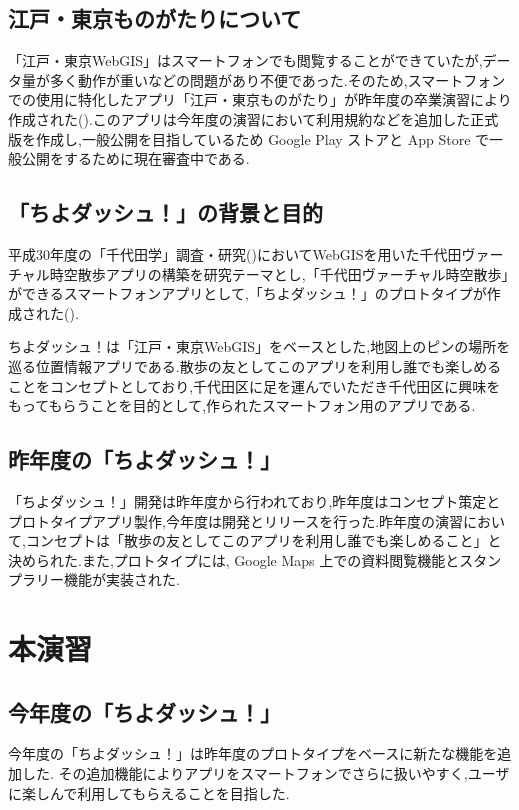 \documentclass[a4paper, twoside]{jarticle}
\begin{document}
\begin{multicols}{2}
\subsection{江戸・東京ものがたりについて}
「江戸・東京WebGIS」はスマートフォンでも閲覧することができていたが,データ量が多く動作が重いなどの問題があり不便であった.そのため,スマートフォンでの使用に特化したアプリ「江戸・東京ものがたり」が昨年度の卒業演習により作成された(\cite{houkokusyo_30}).このアプリは今年度の演習において利用規約などを追加した正式版を作成し,一般公開を目指しているため Google Play ストアと App Store で一般公開をするために現在審査中である.

\subsection{「ちよダッシュ！」の背景と目的}
平成30年度の「千代田学」調査・研究(\cite{tiyokenkyu})においてWebGISを用いた千代田ヴァーチャル時空散歩アプリの構築を研究テーマとし,「千代田ヴァーチャル時空散歩」ができるスマートフォンアプリとして,「ちよダッシュ！」のプロトタイプが作成された(\cite{tiyodagaku_houkokusyo}).

ちよダッシュ！は「江戸・東京WebGIS」をベースとした,地図上のピンの場所を巡る位置情報アプリである.散歩の友としてこのアプリを利用し誰でも楽しめることをコンセプトとしており,千代田区に足を運んでいただき千代田区に興味をもってもらうことを目的として,作られたスマートフォン用のアプリである.

\subsection{昨年度の「ちよダッシュ！」}
「ちよダッシュ！」開発は昨年度から行われており,昨年度はコンセプト策定とプロトタイプアプリ製作,今年度は開発とリリースを行った.昨年度の演習において,コンセプトは「散歩の友としてこのアプリを利用し誰でも楽しめること」と決められた.また,プロトタイプには, Google Maps 上での資料閲覧機能とスタンプラリー機能が実装された.

\section{本演習}

\subsection{今年度の「ちよダッシュ！」}
今年度の「ちよダッシュ！」は昨年度のプロトタイプをベースに新たな機能を追加した.
その追加機能によりアプリをスマートフォンでさらに扱いやすく,ユーザに楽しんで利用してもらえることを目指した.


\end{multicols}
\end{document}
